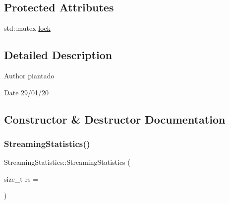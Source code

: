 \subsection*{Protected Attributes}
\begin{DoxyCompactItemize}
\item 
std\+::mutex \hyperlink{class_streaming_statistics_a4be98d1901cf9054a0a97587763b3c6f}{lock}
\end{DoxyCompactItemize}


\subsection{Detailed Description}
\begin{DoxyAuthor}{Author}
piantado 
\end{DoxyAuthor}
\begin{DoxyDate}{Date}
29/01/20 
\end{DoxyDate}


\subsection{Constructor \& Destructor Documentation}
\mbox{\label{class_streaming_statistics_a92bd26dffa8b7569afc01c4a6ebe4e87}} 
\subsubsection{\texorpdfstring{Streaming\+Statistics()}{StreamingStatistics()}\hspace{0.1cm}{\footnotesize\ttfamily [1/2]}}
{\footnotesize\ttfamily Streaming\+Statistics\+::\+Streaming\+Statistics (\begin{DoxyParamCaption}\item[{size\+\_\+t}]{rs = {} }\end{DoxyParamCaption})\hspace{0.3cm}{\ttfamily [inline]}}

\mbox{\label{class_streaming_statistics_a2ee20794cfeed51064973dd896b8301d}} 

